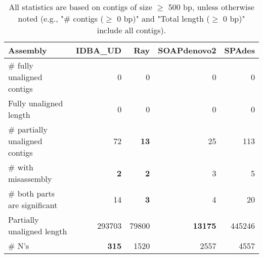 \documentclass[12pt,a4paper]{article}
\begin{document}
\begin{table}[ht]
\begin{center}
\caption{All statistics are based on contigs of size $\geq$ 500 bp, unless otherwise noted (e.g., "\# contigs ($\geq$ 0 bp)" and "Total length ($\geq$ 0 bp)" include all contigs).}
\begin{tabular}{|l*{4}{|r}|}
\hline
Assembly & IDBA\_UD & Ray & SOAPdenovo2 & SPAdes \\ \hline
\# fully unaligned contigs & 0 & 0 & 0 & 0 \\ \hline
Fully unaligned length & 0 & 0 & 0 & 0 \\ \hline
\# partially unaligned contigs & 72 & {\bf 13} & 25 & 113 \\ \hline
\hspace{5mm}\# with misassembly & {\bf 2} & {\bf 2} & 3 & 5 \\ \hline
\hspace{5mm}\# both parts are significant & 14 & {\bf 3} & 4 & 20 \\ \hline
Partially unaligned length & 293703 & 79800 & {\bf 13175} & 445246 \\ \hline
\# N's & {\bf 315} & 1520 & 2557 & 4557 \\ \hline
\end{tabular}
\end{center}
\end{table}
\end{document}
